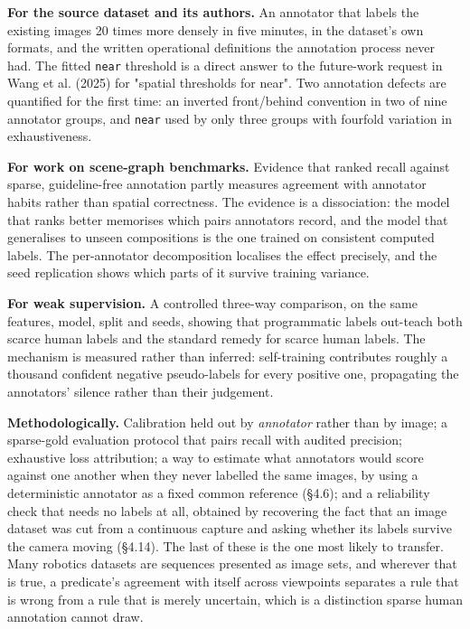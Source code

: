 \textbf{For the source dataset and its authors.} An annotator that labels the existing images 20 times more densely in five minutes, in the dataset's own formats, and the written operational definitions the annotation process never had. The fitted \texttt{near} threshold is a direct answer to the future-work request in Wang et al. (2025) for "spatial thresholds for near". Two annotation defects are quantified for the first time: an inverted front/behind convention in two of nine annotator groups, and \texttt{near} used by only three groups with fourfold variation in exhaustiveness.

\textbf{For work on scene-graph benchmarks.} Evidence that ranked recall against sparse, guideline-free annotation partly measures agreement with annotator habits rather than spatial correctness. The evidence is a dissociation: the model that ranks better memorises which pairs annotators record, and the model that generalises to unseen compositions is the one trained on consistent computed labels. The per-annotator decomposition localises the effect precisely, and the seed replication shows which parts of it survive training variance.

\textbf{For weak supervision.} A controlled three-way comparison, on the same features, model, split and seeds, showing that programmatic labels out-teach both scarce human labels and the standard remedy for scarce human labels. The mechanism is measured rather than inferred: self-training contributes roughly a thousand confident negative pseudo-labels for every positive one, propagating the annotators' silence rather than their judgement.

\textbf{Methodologically.} Calibration held out by \textit{annotator} rather than by image; a sparse-gold evaluation protocol that pairs recall with audited precision; exhaustive loss attribution; a way to estimate what annotators would score against one another when they never labelled the same images, by using a deterministic annotator as a fixed common reference (\S4.6); and a reliability check that needs no labels at all, obtained by recovering the fact that an image dataset was cut from a continuous capture and asking whether its labels survive the camera moving (\S4.14). The last of these is the one most likely to transfer. Many robotics datasets are sequences presented as image sets, and wherever that is true, a predicate's agreement with itself across viewpoints separates a rule that is wrong from a rule that is merely uncertain, which is a distinction sparse human annotation cannot draw.


